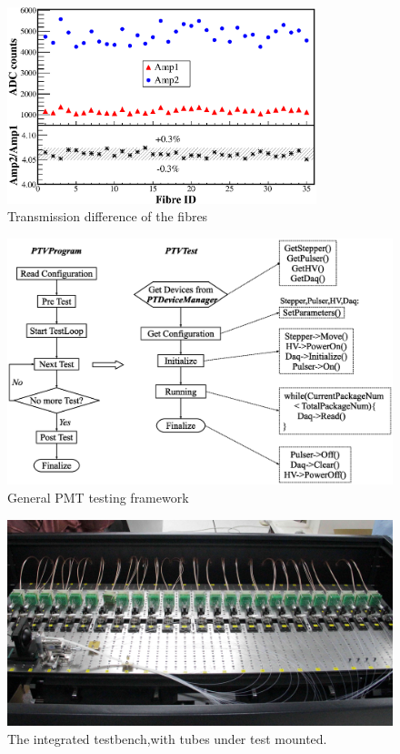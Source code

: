 \documentclass[5p, times]{elsarticle}
\begin{document}
\begin{figure}[h]
 \centering
 \includegraphics[width=90mm]{fibre_diff}
\caption{Transmission difference of the fibres}
\label{fig:fibre_diff}
\end{figure} 

\begin{figure}
\centering
 \includegraphics[width=140mm]{software_framework}
\caption{General PMT testing framework}
\label{fig:software_framework}
\end{figure}

\begin{figure}[t]
 \centering
 \includegraphics[width=140mm]{integration1_crop}
\caption{The integrated testbench,with tubes under test mounted.}
\label{fig:integrated_testbench}
\end{figure}
\end{document}
